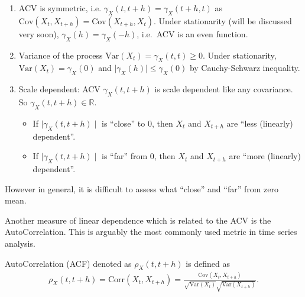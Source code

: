 \documentclass[]{book}
\providecommand{\tightlist}{%
  \setlength{\itemsep}{0pt}\setlength{\parskip}{0pt}}
\theoremstyle{definition}
\theoremstyle{definition}
\theoremstyle{definition}
\theoremstyle{remark}
\let\BeginKnitrBlock\begin \let\EndKnitrBlock\end
\begin{document}
\begin{enumerate}
\def\labelenumi{\arabic{enumi}.}
\item
  ACV is symmetric, i.e. \(\gamma_X(t, t+h) = \gamma_X(t+h, t)\) as
  \(\text{Cov}(X_{t},X_{t+h}) = \text{Cov}(X_{t+h},X_{t})\). Under
  stationarity (will be discussed very soon),
  \(\gamma_X(h) = \gamma_X(-h)\), i.e.~ACV is an even function.
\item
  Variance of the process \(\text{Var}(X_t) = \gamma_X(t, t) \geq 0\).
  Under stationarity, \(\text{Var}(X_t) = \gamma_X(0)\) and
  \(\mid \gamma_X(h) \mid \leq \gamma_X(0)\) by Cauchy-Schwarz
  inequality.
\item
  Scale dependent: ACV \(\gamma_X(t, t+h)\) is scale dependent like any
  covariance. So \(\gamma_X(t, t+h) \in \mathbb{R}\).

  \begin{itemize}
  \tightlist
  \item
    If \(\mid \gamma_X(t, t+h) \mid\) is ``close'' to 0, then \(X_{t}\)
    and \(X_{t+h}\) are ``less (linearly) dependent''.
  \item
    If \(\mid \gamma_X(t, t+h) \mid\) is ``far'' from 0, then \(X_{t}\)
    and \(X_{t+h}\) are ``more (linearly) dependent''.
  \end{itemize}
\end{enumerate}

However in general, it is difficult to assess what ``close'' and ``far''
from zero mean.


Another measure of linear dependence which is related to the ACV is the
AutoCorrelation. This is arguably the most commonly used metric in time
series analysis.

\BeginKnitrBlock{definition}[AutoCorrelation]
\protect\hypertarget{def:ACF}{}{\label{def:ACF} {} }AutoCorrelation (ACF) denoted as \(\rho_X(t, t+h)\) is defined as
\begin{align*}
\rho_X(t,t+h) = \text{Corr}(X_{t},X_{t+h}) = \frac{\text{Cov}(X_{t},X_{t+h})}{\sqrt{\text{Var}(X_{t})} \sqrt{\text{Var}(X_{t+h})}}.
\end{align*}
\EndKnitrBlock{definition}
\end{document}
